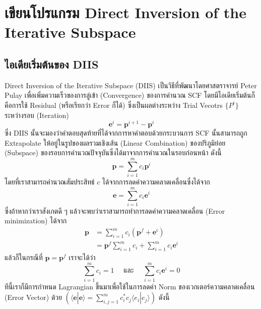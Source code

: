 \section{เขียนโปรแกรม Direct Inversion of the Iterative Subspace}

\subsection{ไอเดียเริ่มต้นของ DIIS}

Direct Inversion of the Iterative Subspace (DIIS) เป็นวิธีที่พัฒนาโดยศาสตราจารย์ Peter Pulay เพื่อเพิ่มความเร็วของการลู่เข้า (Convergence) ของการคำนวณ SCF\autocite{pulay1980} โดยมีไอเดียเริ่มต้นก็คือการใช้ Residual (หรือเรียกว่า Error ก็ได้) ซึ่งเป็นผลต่างระหว่าง Trial Vecotrs $\{ P^{i}\}$ ระหว่างรอบ (Iteration)
%
\begin{equation}
  \mathbf{e}^i
  =
  \mathbf{p}^{i+1} - \mathbf{p}^i
\end{equation}
%
ซึ่ง DIIS นั้นจะมองว่าคำตอบสุดท้ายที่ได้จากการหาคำตอบด้วยกระบวนการ SCF นั้นสามารถถูก Extrapolate ให้อยู่ในรูปของผลรวมเชิงเส้น (Linear Combination) ของปริภูมิย่อย (Subspace) ของรอบการคำนวณปัจจุบันซึ่งได้มาจากการคำนวณในรอบก่อนหน้า ดังนี้
%
\begin{equation}
  \mathbf{p}
  =
  \sum_{i=1}^{m} c_i \mathbf{p}^i
\end{equation}
%
โดยที่เราสามารถคำนวณสัมประสิทธ์ $c$ ได้จากการลดค่าความคลาดเคลื่อนซึ่งได้จาก
%
\begin{equation}
  \mathbf{e}
  =
  \sum_{i=1}^{m} c_i \mathbf{e}^i
\end{equation}
%
ซึ่งถ้าหากว่าเราสังเกตดี ๆ แล้วจะพบว่าเราสามารถทำการลดค่าความคลาดเคลื่อน (Error minimization) ได้จาก
%
\begin{align}
  \mathbf{p}
   & =
  \sum_{i=1}^{m} c_i \left( \mathbf{p}^f + \mathbf{e}^i\right) \\
   & =
  \mathbf{p}^f \sum_{i=1}^{m} c_i  + \sum_{i=1}^{m} c_i \mathbf{e}^i
\end{align}
%
แล้วก็ในกรณีที่ $\mathbf{p} = \mathbf{p}^f$ เราจะได้ว่า
%
\begin{equation}
  \sum_{i=1}^{m} c_i = 1
  \quad
  \text{ และ }
  \quad
  \sum_{i=1}^{m} c_i \mathbf{e}^i = 0
\end{equation}
%
ทีนี้เราก็มีการกำหนด Lagrangian ขึ้นมาเพื่อใช้ในการลดค่า Norm ของเวกเตอร์ความคลาดเคลื่อน (Error Vector) ด้วย $(\langle \mathbf{e} | \mathbf{e} \rangle = \sum_{i,j = 1}^{m} c_i^* c_j \langle e_i | e_j \rangle)$ ดังนี้
